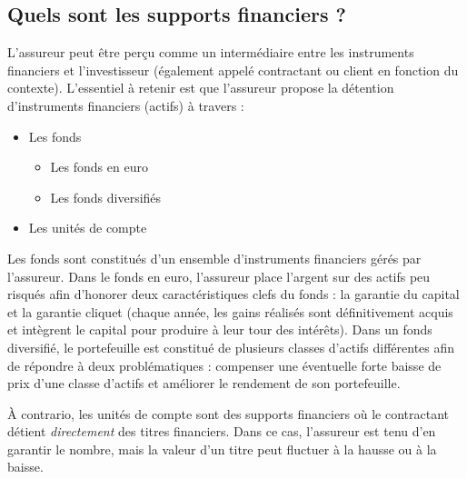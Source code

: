 \documentclass{article}
\begin{document}
\subsection{Quels sont les supports financiers ?}
L'assureur peut être perçu comme un intermédiaire entre les instruments financiers et l'investisseur (également appelé contractant ou client en fonction du contexte). L'essentiel à retenir est que l'assureur propose la détention d'instruments financiers (actifs) à travers :
\begin{itemize}
    \item Les fonds
        \begin{itemize}
            \item Les fonds en euro
            \item Les fonds diversifiés
        \end{itemize}
    \item Les unités de compte
\end{itemize}

Les fonds sont constitués d'un ensemble d'instruments financiers gérés par l'assureur. Dans le fonds en euro, l'assureur place l'argent sur des actifs peu risqués afin d'honorer deux caractéristiques clefs du fonds : la garantie du capital et la garantie cliquet (chaque année, les gains réalisés sont définitivement acquis et intègrent le capital pour produire à leur tour des intérêts). Dans un fonds diversifié, le portefeuille est constitué de plusieurs classes d'actifs différentes afin de répondre à deux problématiques : compenser une éventuelle forte baisse de prix d'une classe d'actifs et améliorer le rendement de son portefeuille.

À contrario, les unités de compte sont des supports financiers où le contractant détient \textit{directement} des titres financiers. Dans ce cas, l'assureur est tenu d'en garantir le nombre, mais la valeur d'un titre peut fluctuer à la hausse ou à la baisse.

\end{document}
